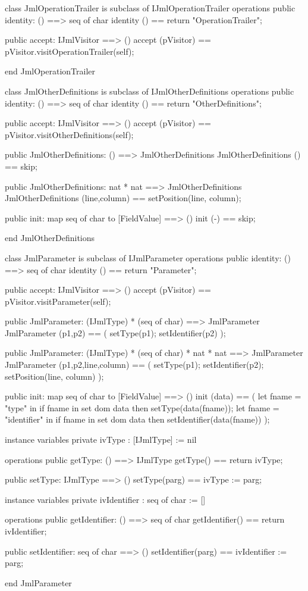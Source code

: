 \begin{vdm_al}
class JmlOperationTrailer is subclass of IJmlOperationTrailer
operations
  public identity: () ==> seq of char
  identity () == return "OperationTrailer";

  public accept: IJmlVisitor ==> ()
  accept (pVisitor) == pVisitor.visitOperationTrailer(self);

end JmlOperationTrailer
\end{vdm_al}
\begin{vdm_al}
class JmlOtherDefinitions is subclass of IJmlOtherDefinitions
operations
  public identity: () ==> seq of char
  identity () == return "OtherDefinitions";

  public accept: IJmlVisitor ==> ()
  accept (pVisitor) == pVisitor.visitOtherDefinitions(self);

  public JmlOtherDefinitions:
    () ==> JmlOtherDefinitions
  JmlOtherDefinitions () == 
    skip;

  public JmlOtherDefinitions:
    nat *
    nat ==> JmlOtherDefinitions
  JmlOtherDefinitions (line,column) == 
    setPosition(line, column);

  public init: map seq of char to [FieldValue] ==> ()
  init (-) == skip;

end JmlOtherDefinitions
\end{vdm_al}

\begin{vdm_al}
class JmlParameter is subclass of IJmlParameter
operations
  public identity: () ==> seq of char
  identity () == return "Parameter";

  public accept: IJmlVisitor ==> ()
  accept (pVisitor) == pVisitor.visitParameter(self);

  public JmlParameter:
    (IJmlType) *
    (seq of char) ==> JmlParameter
  JmlParameter (p1,p2) == 
    ( setType(p1);
      setIdentifier(p2) );

  public JmlParameter:
    (IJmlType) *
    (seq of char) *
    nat *
    nat ==> JmlParameter
  JmlParameter (p1,p2,line,column) == 
    ( setType(p1);
      setIdentifier(p2);
      setPosition(line, column) );

  public init: map seq of char to [FieldValue] ==> ()
  init (data) ==
    ( let fname = "type" in
        if fname in set dom data
        then setType(data(fname));
      let fname = "identifier" in
        if fname in set dom data
        then setIdentifier(data(fname)) );

instance variables
  private ivType : [IJmlType] := nil

operations
  public getType: () ==> IJmlType
  getType() == return ivType;

  public setType: IJmlType ==> ()
  setType(parg) == ivType := parg;

instance variables
  private ivIdentifier : seq of char := []

operations
  public getIdentifier: () ==> seq of char
  getIdentifier() == return ivIdentifier;

  public setIdentifier: seq of char ==> ()
  setIdentifier(parg) == ivIdentifier := parg;

end JmlParameter
\end{vdm_al}

